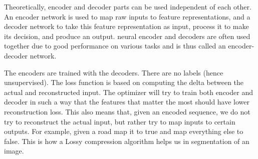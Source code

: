 Theoretically, encoder and decoder parts can be used independent of each other. An encoder network is used to map raw inputs to feature representations, and a decoder network to take this feature representation as input, process it to make its decision, and produce an output. neural encoder and decoders are often used together due to good performance on various tasks and is thus called an encoder-decoder network.









The encoders are trained with the decoders. There are no labels (hence unsupervised). The loss function is based on computing the delta between the actual and reconstructed input. The optimizer will try to train both encoder and decoder in such a way that the features that matter the most should have lower reconstruction loss. This also means that, given an encoded sequence, we do not try to reconstruct the actual input, but rather try to map inputs to certain outputs. For example, given a road map it to true and map everything else to false. This is how a Lossy compression algorithm helps us in segmentation of an image.


